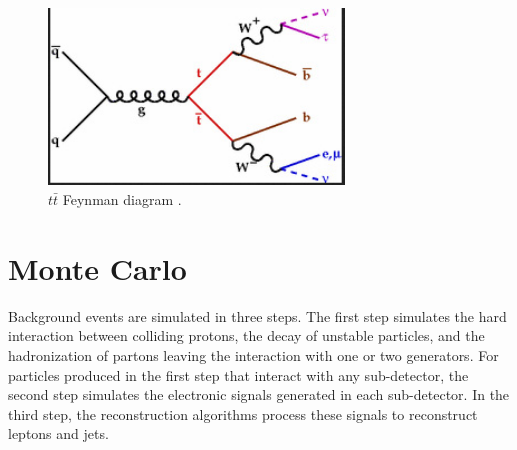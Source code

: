 \begin{figure}[h]
	\centering
	\includegraphics[width=0.7\textwidth]{figures/topAntiTopFeynDiagram.png}
	\caption{$t\bar{t}$ Feynman diagram \cite{ttbarDiagram}.}
	\label{fig:ttbarDiag}
\end{figure}


\section{Monte Carlo}
\label{sec:MC}


Background events are simulated in three steps.  The first 
step simulates the hard interaction between colliding protons, the decay of unstable particles, and the hadronization of 
partons leaving the interaction with one or two \MC generators.  For particles produced in the first step that interact with 
any sub-detector, the second step simulates the electronic signals generated in each sub-detector.  In the third step, the 
reconstruction algorithms process these signals to reconstruct leptons and jets.

